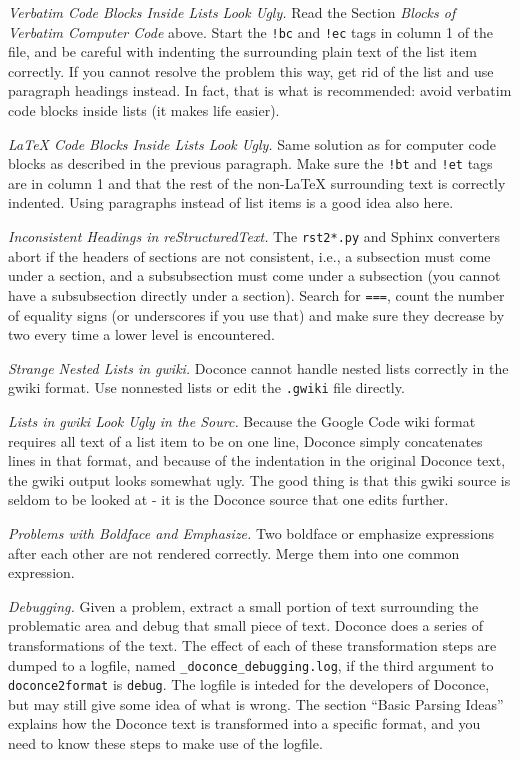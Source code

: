 \documentclass[a4paper,english]{article}
\begin{document}
\emph{Verbatim Code Blocks Inside Lists Look Ugly.} Read the Section \emph{Blocks of Verbatim Computer Code} above.  Start the
\texttt{!bc} and \texttt{!ec} tags in column 1 of the file, and be careful with
indenting the surrounding plain text of the list item correctly. If
you cannot resolve the problem this way, get rid of the list and use
paragraph headings instead. In fact, that is what is recommended:
avoid verbatim code blocks inside lists (it makes life easier).

\emph{LaTeX Code Blocks Inside Lists Look Ugly.} Same solution as for computer code blocks as described in the
previous paragraph. Make sure the \texttt{!bt} and \texttt{!et} tags are in column 1
and that the rest of the non-LaTeX surrounding text is correctly indented.
Using paragraphs instead of list items is a good idea also here.

\emph{Inconsistent Headings in reStructuredText.} The \texttt{rst2*.py} and Sphinx converters abort if the headers of sections
are not consistent, i.e., a subsection must come under a section,
and a subsubsection must come under a subsection (you cannot have
a subsubsection directly under a section). Search for \texttt{===},
count the number of equality signs (or underscores if you use that)
and make sure they decrease by two every time a lower level is encountered.

\emph{Strange Nested Lists in gwiki.} Doconce cannot handle nested lists correctly in the gwiki format.
Use nonnested lists or edit the \texttt{.gwiki} file directly.

\emph{Lists in gwiki Look Ugly in the Sourc.} Because the Google Code wiki format requires all text of a list item to
be on one line, Doconce simply concatenates lines in that format,
and because of the indentation in the original Doconce text, the gwiki
output looks somewhat ugly. The good thing is that this gwiki source
is seldom to be looked at - it is the Doconce source that one edits
further.

\emph{Problems with Boldface and Emphasize.} Two boldface or emphasize expressions after each other are not rendered
correctly. Merge them into one common expression.

\emph{Debugging.} Given a problem, extract a small portion of text surrounding the
problematic area and debug that small piece of text. Doconce does a
series of transformations of the text. The effect of each of these
transformation steps are dumped to a logfile, named
\texttt{\_doconce\_debugging.log}, if the third argument to \texttt{doconce2format}
is \texttt{debug}. The logfile is inteded for the developers of Doconce, but
may still give some idea of what is wrong.  The section ``Basic Parsing
Ideas'' explains how the Doconce text is transformed into a specific
format, and you need to know these steps to make use of the logfile.
\end{document}
